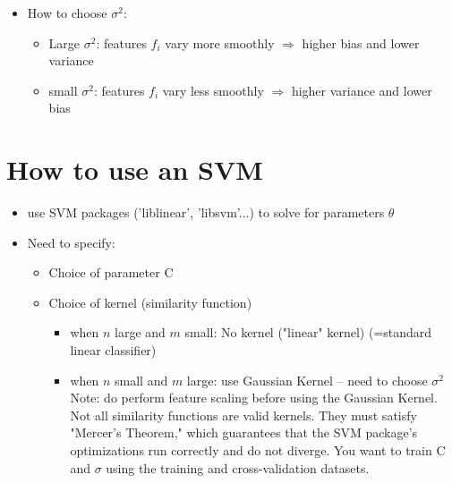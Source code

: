 \documentclass[a4paper,12pt]{report}
\begin{document}
\begin{itemize}
\item How to choose $\sigma^2$:
\begin{itemize}
\item Large $\sigma^2$: features $f_i$ vary more smoothly $\Rightarrow$ higher bias and lower variance
\item small $\sigma^2$: features $f_i$ vary less smoothly $\Rightarrow$ higher variance and lower bias
\end{itemize}
\end{itemize}

\section{How to use an SVM}
\begin{itemize}
	\item use SVM packages ('liblinear', 'libsvm'...) to solve for parameters $\theta$
	\item Need to specify:
	\begin{itemize}
		\item Choice of parameter C
		\item Choice of kernel (similarity function)
			\begin{itemize}
				\item when $n$ large and $m$ small: No kernel ("linear" kernel) (=standard linear classifier)
				\item when $n$ small and $m$ large: use Gaussian Kernel -- need to choose $\sigma^2$ \\
					Note: do perform feature scaling before using the Gaussian Kernel.\\
Not all similarity functions are valid kernels. They must satisfy "Mercer's Theorem," which guarantees that the SVM package's optimizations run correctly and do not diverge.
You want to train C and $\sigma$ using the training and cross-validation datasets.
\end{itemize}
\end{itemize}
\end{itemize}
\end{document}

